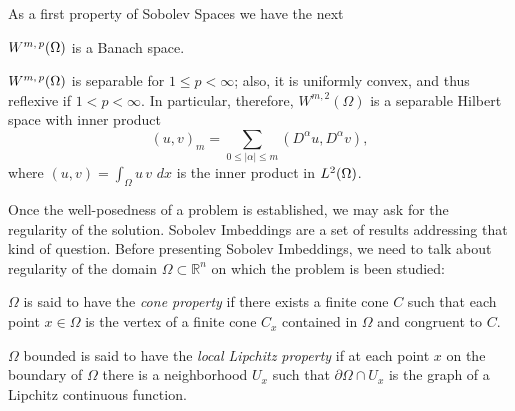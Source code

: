 As a first property of Sobolev Spaces we have the next
\begin{theorem}
${W^{m,\,p}(\Omega)}$ is a Banach space.
\end{theorem}
\begin{theorem}${W^{m,\,p}(\Omega)}$ is separable for $1\leq p < \infty$; also, it is uniformly convex, and thus reflexive if $1<p<\infty$. In particular, therefore, $W^{m,2}(\Omega)$ is a separable Hilbert space with inner product
$$(u,v)_m=\sum_{0\leq|\alpha|\leq m}\left(D^\alpha u,D^\alpha v\right),$$
where $(u,v)=\int_\Omega u\,v\,\,dx$ is the inner product in ${L^{2}(\Omega)}$.
\end{theorem}
Once the well-posedness of a problem is established, we may ask for the regularity of the solution. Sobolev Imbeddings are a set of results addressing that kind of question. Before presenting Sobolev Imbeddings, we need to talk about regularity of the domain $\Omega\subset \mathbb{R}^n$ on which the problem is been studied:
\begin{definition}
$\Omega$ is said to have the \emph{cone property} if there exists a finite cone $C$ such that each point $x\in \Omega$ is the vertex of a finite cone $C_x$ contained in $\Omega$ and congruent to $C$.
\end{definition}
\begin{definition}\label{def:local_lipschitz}
$\Omega$ bounded is said to have the \emph{local Lipchitz property} if at each point $x$ on the boundary of $\Omega$ there is a neighborhood $U_x$ such that $\partial \Omega \cap U_x$ is the graph of a Lipchitz continuous function.
\end{definition}

